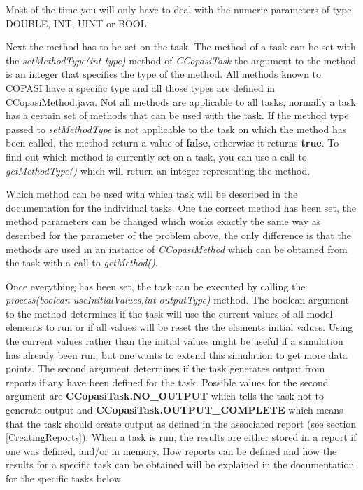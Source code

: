 \documentclass[a4,10pt]{article}
\begin{document}
Most of the time you will only have to deal with the numeric parameters of type DOUBLE, INT, UINT or BOOL.

Next the method has to be set on the task. The method of a task can be set with the \textit{setMethodType(int type)} method of \textit{CCopasiTask} the argument to the method is an integer that specifies the type of the method. All methods known to COPASI have a specific type and all those types are defined in CCopasiMethod.java. Not all methods are applicable to all tasks, normally a task has a certain set of methods that can be used with the task. If the method type passed to \textit{setMethodType} is not applicable to the task on which the method has been called, the method return a value of \textbf{false}, otherwise it returns \textbf{true}.
To find out which method is currently set on a task, you can use a call to \textit{getMethodType()} which will return an integer representing the method.

Which method can be used with which task will be described in the documentation for the individual tasks.
One the correct method has been set, the method parameters can be changed which works exactly the same way as described for the parameter of the problem above, the only difference is that the methods are used in an instance of \textit{CCopasiMethod} which can be obtained from the task with a call to \textit{getMethod()}.

Once everything has been set, the task can be executed by calling the \textit{process(boolean useInitialValues,int outputType)} method. The boolean argument to the method determines if the task will use the current values of all model elements to run or if all values will be reset the the elements initial values. Using the current values rather than the initial values might be useful if a simulation has already been run, but one wants to extend this simulation to get more data points.
The second argument determines if the task generates output from  reports if any have been defined for the task. Possible values for the second argument are \textbf{CCopasiTask.NO\_OUTPUT} which tells the task not to generate output and \textbf{CCopasiTask.OUTPUT\_COMPLETE} which means that the task should create output as defined in the associated report (see section \ref{CreatingReports}). 
When a task is run, the results are either stored in a report if one was defined, and/or in memory. How reports can be defined and how the results for a specific task can be obtained will be explained in the documentation for the specific tasks below.
\end{document}

